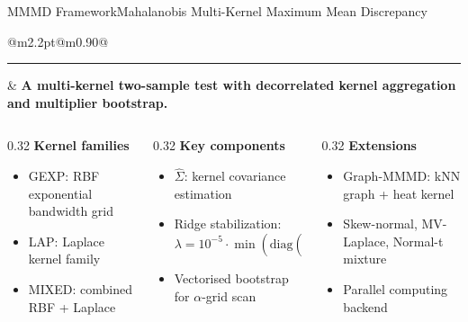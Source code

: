 \documentclass[aspectratio=169,10pt]{beamer}
\makeatletter
\newcommand{\pos}[1]{\textcolor{fudanblue}{#1}}
\newcommand{\HL}[1]{\textcolor{accentgreen}{#1}}
\newcommand{\keyline}[1]{%
  \vspace{0.04cm}
  \noindent\begin{tabular}{@{}m{2.2pt}@{\hspace{0.55em}}m{0.90\linewidth}@{}}
    {\color{accentgreen}\rule{2.2pt}{1.35em}} & \textbf{#1}
  \end{tabular}
  \vspace{0.09cm}
}
\makeatother
\begin{document}
\begin{frame}{MMMD Framework}{Mahalanobis Multi-Kernel Maximum Mean Discrepancy}
\keyline{A multi-kernel two-sample test with decorrelated kernel aggregation and multiplier bootstrap.}
\vspace{0.15cm}
\begin{center}
\end{center}
\vspace{0.12cm}
\begin{columns}[T,totalwidth=\linewidth]
\begin{column}{0.32\linewidth}
\textbf{\pos{Kernel families}}
\begin{itemize}
  \item GEXP: RBF exponential bandwidth grid
  \item LAP: Laplace kernel family
  \item MIXED: combined RBF + Laplace
\end{itemize}
\end{column}
\begin{column}{0.32\linewidth}
\textbf{Key components}
\begin{itemize}
  \item $\hat{\Sigma}$: kernel covariance estimation
  \item Ridge stabilization: $\lambda = 10^{-5} \cdot \min(\mathrm{diag}(\hat{\Sigma}))$
  \item Vectorised bootstrap for $\alpha$-grid scan
\end{itemize}
\end{column}
\begin{column}{0.32\linewidth}
\textbf{\HL{Extensions}}
\begin{itemize}
  \item Graph-MMMD: kNN graph + heat kernel
  \item Skew-normal, MV-Laplace, Normal-t mixture
  \item Parallel computing backend
\end{itemize}
\end{column}
\end{columns}
\end{frame}
\end{document}
